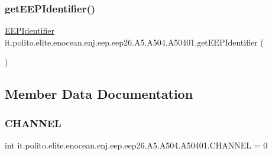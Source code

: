 \subsubsection{\texorpdfstring{get\+E\+E\+P\+Identifier()}{getEEPIdentifier()}}
{\footnotesize\ttfamily \hyperlink{classit_1_1polito_1_1elite_1_1enocean_1_1enj_1_1eep_1_1_e_e_p_identifier}{E\+E\+P\+Identifier} it.\+polito.\+elite.\+enocean.\+enj.\+eep.\+eep26.\+A5.\+A504.\+A50401.\+get\+E\+E\+P\+Identifier (\begin{DoxyParamCaption}{ }\end{DoxyParamCaption})}



\subsection{Member Data Documentation}
\hypertarget{classit_1_1polito_1_1elite_1_1enocean_1_1enj_1_1eep_1_1eep26_1_1_a5_1_1_a504_1_1_a50401_addfa8585c3fc1044192de82a815aa1fa}{}\label{classit_1_1polito_1_1elite_1_1enocean_1_1enj_1_1eep_1_1eep26_1_1_a5_1_1_a504_1_1_a50401_addfa8585c3fc1044192de82a815aa1fa} 
\subsubsection{\texorpdfstring{C\+H\+A\+N\+N\+EL}{CHANNEL}}
{\footnotesize\ttfamily int it.\+polito.\+elite.\+enocean.\+enj.\+eep.\+eep26.\+A5.\+A504.\+A50401.\+C\+H\+A\+N\+N\+EL = 0\hspace{0.3cm}{\ttfamily [static]}}

\hypertarget{classit_1_1polito_1_1elite_1_1enocean_1_1enj_1_1eep_1_1eep26_1_1_a5_1_1_a504_1_1_a50401_a63daa6f785304f331a8f989fed42c817}{}\label{classit_1_1polito_1_1elite_1_1enocean_1_1enj_1_1eep_1_1eep26_1_1_a5_1_1_a504_1_1_a50401_a63daa6f785304f331a8f989fed42c817} 
